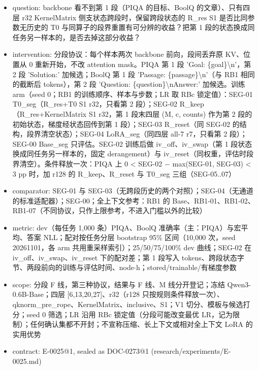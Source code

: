\documentclass[11pt]{article}
\begin{document}
\begin{itemize}
\item question: backbone 看不到第 1 段（PIQA 的目标、BoolQ 的文章）、只有四层 r32 KernelMatrix 侧支状态跨段时，保留跨段状态的 R\_res S1 是否比同参数无历史的 T0 与同算子的段界重置有可分辨的收益？把第 1 段的状态换成同任务另一样本的，是否去掉这部分收益？
\item intervention: 分段协议：每个样本两次 backbone 前向，段间丢弃原 KV、位置从 0 重新开始，不改 attention mask。PIQA 第 1 段 'Goal: \{goal\}\textbackslash{}n'，第 2 段 'Solution:' 加候选；BoolQ 第 1 段 'Passage: \{passage\}\textbackslash{}n'（与 RB1 相同的截断后 tokens），第 2 段 'Question: \{question\}\textbackslash{}nAnswer:' 加候选。训练 arm（seed 0；RB1 的训练顺序、样本与步数；LR 取 RBc 锁定值）：SEG-01 T0\_seg（R\_res+T0 S1 r32，只看第 2 段）；SEG-02 R\_keep（R\_res+KernelMatrix S1 r32，第 1 段末四层 (M, c, counts) 作为第 2 段的初始状态，梯度经状态回传到第 1 段）；SEG-03 R\_reset（同 SEG-02 的结构，段界清空状态）；SEG-04 LoRA\_seg（同四层 all-7 r7，只看第 2 段）；SEG-00 Base\_seg 只评估。SEG-02 训练后做 iv\_off、iv\_swap（第 1 段状态换成同任务另一样本的，固定 derangement）与 iv\_reset（同权重，评估时段界清空）。条件释放一次：PIQA 上 0 \textless{} SEG-02 \ensuremath{-} max(SEG-01, SEG-03) \textless{} 3 pp 时，加 r128 的 R\_keep、R\_reset 与 T0\_seg 三组（SEG-05..07）
\item comparator: SEG-01 与 SEG-03（无跨段历史的两个对照）；SEG-04（无通道的标准适配器）；SEG-00；全上下文参考：RB1 的 Base、RB1-01、RB1-02、RB1-07（不同协议，只作上限参考，不进入门槛以外的比较）
\item metric: dev（每任务 1,000 条）PIQA、BoolQ 准确率（主：PIQA）与宏平均、答案 NLL；配对按任务分层 bootstrap 95\% 区间（10,000 次，seed 20261101，各 arm 共用重采样索引）；25/50/75/100\% dev 曲线；SEG-02 在 iv\_off、iv\_swap、iv\_reset 下的配对差；第 1 段写入 tokens、跨段状态字节、两段前向的训练与评估时间、node\ensuremath{\cdot}h；stored/trainable/有梯度参数
\item scope: 分段 F 线，第三种协议，结果与 F 线、M 线分开登记；冻结 Qwen3-0.6B-Base；四层 [6,13,20,27]、r32（r128 只按规则条件释放一次）、qknorm\_pre\_rope、KernelMatrix、inclusive、S1；V1 切分、模板与候选打分；seed 0 筛选；LR 沿用 RBc 锁定值（分段可能改变最优 LR，记为限制）；任何确认集都不开封；不宣称压缩、长上下文或相对全上下文 LoRA 的实用优势
\item contract: E-0025@1, sealed as DOC-0273@1 (research/experiments/E-0025.md)
\end{itemize}
\end{document}
